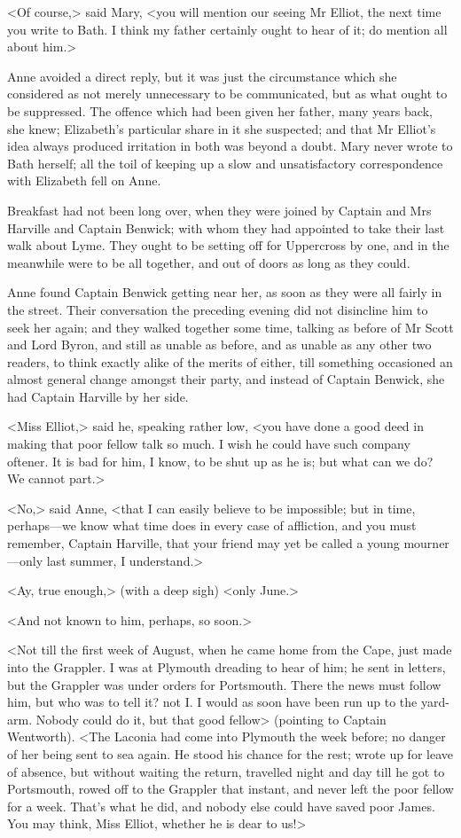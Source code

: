 <Of course,> said Mary, <you will mention our seeing Mr Elliot, the next time you write to Bath. I think my father certainly ought to hear of it; do mention all about him.>

Anne avoided a direct reply, but it was just the circumstance which she considered as not merely unnecessary to be communicated, but as what ought to be suppressed. The offence which had been given her father, many years back, she knew; Elizabeth's particular share in it she suspected; and that Mr Elliot's idea always produced irritation in both was beyond a doubt. Mary never wrote to Bath herself; all the toil of keeping up a slow and unsatisfactory correspondence with Elizabeth fell on Anne.

Breakfast had not been long over, when they were joined by Captain and Mrs Harville and Captain Benwick; with whom they had appointed to take their last walk about Lyme. They ought to be setting off for Uppercross by one, and in the meanwhile were to be all together, and out of doors as long as they could.

Anne found Captain Benwick getting near her, as soon as they were all fairly in the street. Their conversation the preceding evening did not disincline him to seek her again; and they walked together some time, talking as before of Mr Scott and Lord Byron, and still as unable as before, and as unable as any other two readers, to think exactly alike of the merits of either, till something occasioned an almost general change amongst their party, and instead of Captain Benwick, she had Captain Harville by her side.

<Miss Elliot,> said he, speaking rather low, <you have done a good deed in making that poor fellow talk so much. I wish he could have such company oftener. It is bad for him, I know, to be shut up as he is; but what can we do? We cannot part.>

<No,> said Anne, <that I can easily believe to be impossible; but in time, perhaps—we know what time does in every case of affliction, and you must remember, Captain Harville, that your friend may yet be called a young mourner—only last summer, I understand.>

<Ay, true enough,> (with a deep sigh) <only June.>

<And not known to him, perhaps, so soon.>

<Not till the first week of August, when he came home from the Cape, just made into the Grappler. I was at Plymouth dreading to hear of him; he sent in letters, but the Grappler was under orders for Portsmouth. There the news must follow him, but who was to tell it? not I\@. I would as soon have been run up to the yard-arm. Nobody could do it, but that good fellow> (pointing to Captain Wentworth). <The Laconia had come into Plymouth the week before; no danger of her being sent to sea again. He stood his chance for the rest; wrote up for leave of absence, but without waiting the return, travelled night and day till he got to Portsmouth, rowed off to the Grappler that instant, and never left the poor fellow for a week. That's what he did, and nobody else could have saved poor James. You may think, Miss Elliot, whether he is dear to us!>

